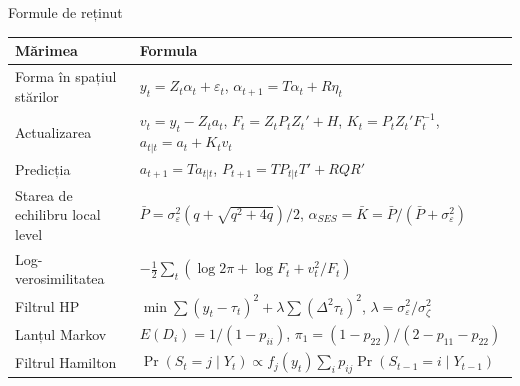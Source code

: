 \begin{frame}{Formule de reținut}
\itemsize{\small}
{\renewcommand{\arraystretch}{1.35}\begin{center}
\footnotesize
\begin{tabular}{ll}
\toprule
\textbf{Mărimea} & \textbf{Formula} \\
\midrule
Forma în spațiul stărilor & $y_t = Z_t\alpha_t + \varepsilon_t$, \quad $\alpha_{t+1} = T\alpha_t + R\eta_t$ \\
Actualizarea & $v_t = y_t - Z_ta_t$, \quad $F_t = Z_tP_tZ_t' + H$, \quad $K_t = P_tZ_t'F_t^{-1}$, \quad $a_{t|t} = a_t + K_tv_t$ \\
Predicția & $a_{t+1} = Ta_{t|t}$, \quad $P_{t+1} = TP_{t|t}T' + RQR'$ \\
Starea de echilibru local level & $\bar P = \sigma^2_\varepsilon(q + \sqrt{q^2 + 4q})/2$, \quad $\alpha_{SES} = \bar K = \bar P/(\bar P + \sigma^2_\varepsilon)$ \\
Log-verosimilitatea & $-\frac12\sum_t(\log 2\pi + \log F_t + v_t^2/F_t)$ \\
Filtrul HP & $\min\sum(y_t - \tau_t)^2 + \lambda\sum(\Delta^2\tau_t)^2$, \quad $\lambda = \sigma^2_\varepsilon/\sigma^2_\zeta$ \\
Lanțul Markov & $E(D_i) = 1/(1 - p_{ii})$, \quad $\pi_1 = (1 - p_{22})/(2 - p_{11} - p_{22})$ \\
Filtrul Hamilton & $\Pr(S_t = j \mid Y_t) \propto f_j(y_t)\sum_i p_{ij}\Pr(S_{t-1} = i \mid Y_{t-1})$ \\
\bottomrule
\end{tabular}
\end{center}
}
\end{frame}


